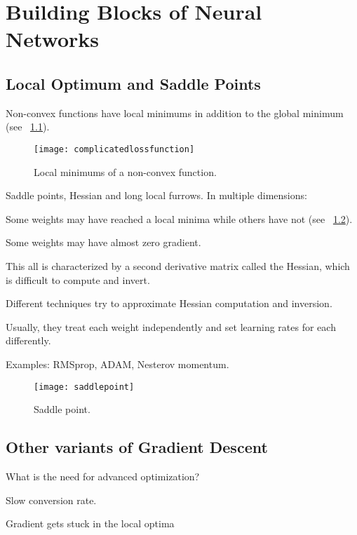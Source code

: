 	\chapter{Building Blocks of Neural Networks}

	\section{Local Optimum and Saddle Points}
Non-convex functions have local minimums in addition to the global minimum (see \figurename~\ref{fig:complicatedlossfunction}).
 	\begin{figure}[h]
		\centering
		\texttt{[image: complicatedlossfunction]}
		\caption[Local minimums of a non-convex function]{Local minimums of a non-convex function.}
		\label{fig:complicatedlossfunction}
	\end{figure}

Saddle points, Hessian and long local furrows.  In multiple dimensions:
	\begin{bulletedlist}
		\item Some weights may have reached a local minima while others have not (see \figurename~\ref{fig:saddlepoint}).
		\item Some weights may have almost zero gradient.
		\item This all is characterized by a second derivative matrix called the Hessian, which is difficult to compute and invert.
		\item Different techniques try to approximate Hessian computation and inversion.
		\item Usually, they treat each weight independently and set learning rates for each differently.
		\item Examples: RMSprop, ADAM, Nesterov momentum.
	\end{bulletedlist}
 	\begin{figure}[h]
		\centering
		\texttt{[image: saddlepoint]}
		\caption[Saddle point]{Saddle point.}
		\label{fig:saddlepoint}
	\end{figure}


	\section{Other variants of Gradient Descent}
What is the need for advanced optimization?
	\begin{bulletedlist}
		\item Slow conversion rate.
		\item Gradient gets stuck in the local optima
	\end{bulletedlist}

